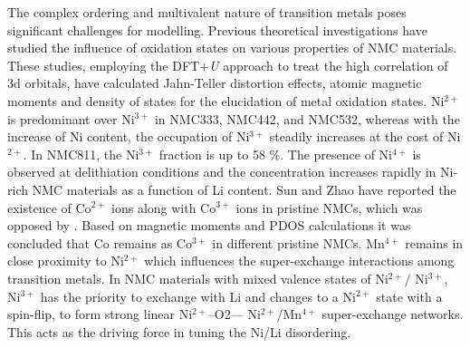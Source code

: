 \documentclass[aps,prb,twocolumn,superscriptaddress,reprint]{revtex4-1}
\begin{document}
The complex ordering and multivalent nature of transition metals poses significant challenges for modelling.
Previous theoretical investigations have studied the influence of oxidation states on various properties of NMC materials. \cite{Dan-Thomas-chemmater,Sun_JPhysChemC2017,Dixit_JPhysChemC2017,Hoang_ACSChemMater2016,Dixit_JElecSoc2017}  These studies, employing the DFT+\textit{U} approach to treat the high correlation of 3d orbitals, have calculated Jahn-Teller distortion effects, atomic magnetic moments and density of states for the elucidation of metal oxidation states. 
Ni$^{2+}$ is predominant over Ni$^{3+}$ in NMC333, NMC442, and NMC532, whereas with the increase of Ni content, the occupation of Ni$^{3+}$ steadily increases at the cost of Ni$^{2+}$. 
In NMC811, the Ni$^{3+}$  fraction is up to 58 \%. \cite{ Sun_JPhysChemC2017} 
The presence of Ni$^{4+}$ is observed at delithiation conditions and the concentration increases rapidly in Ni-rich NMC materials as a function of Li content. \cite{Dixit_JPhysChemC2017} 
Sun and Zhao \cite{ Sun_JPhysChemC2017} have reported the existence of Co$^{2+}$ ions along with Co$^{3+}$  ions in pristine NMCs, which was opposed by \citeauthor{Dixit_JPhysChemC2017}\cite{ Dixit_JPhysChemC2017}. 
Based on magnetic moments and PDOS calculations it was concluded that Co remains as Co$^{3+}$ in different pristine NMCs. Mn$^{4+}$ remains in close proximity to Ni$^{2+}$ which influences the super-exchange interactions among transition metals. \cite{zheng2019} In NMC materials with mixed valence states of Ni$^{2+}$/ Ni$^{3+}$, Ni$^{3+}$  has the priority to exchange with Li and changes to a Ni$^{2+}$ state with a spin-flip, to form strong linear Ni$^{2+}$–O2–– Ni$^{2+}$/Mn$^{4+}$ super-exchange networks. 
This acts as the driving force in tuning the Ni/Li disordering. \cite{zheng2019,Zheng-acs.jpclett-2017}
\end{document}

